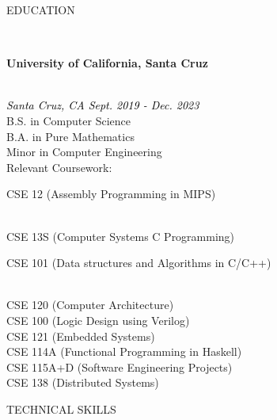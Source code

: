 \documentclass[letterpaper,10pt]{article}
\begin{document}
\begin{multicols*}{2}
  \begin{LARGE} \noindent\faSchool\hspace{5px}EDUCATION \end{LARGE}
  \vspace{.5em} \\
  \begin{large}
    \textbf{University of California, Santa Cruz}
  \end{large} \\
  \textit{\textcolor{black}{Santa Cruz, CA \qquad Sept. 2019 - Dec. 2023}} \\
  B.S. in Computer Science \\ 
  B.A. in Pure Mathematics \\
  Minor in Computer Engineering \\
  Relevant Coursework: \\
  \indent \parbox{.45\textwidth}{CSE 12 (Assembly Programming in MIPS)}\\
  \indent CSE 13S (Computer Systems C Programming)\\
  \indent \parbox{.45\textwidth}{CSE 101 (Data structures and Algorithms in C/C++)}\\
  \indent CSE 120 (Computer Architecture)\\
  \indent CSE 100 (Logic Design using Verilog)\\
  \indent CSE 121 (Embedded Systems)\\
  \indent CSE 114A (Functional Programming in Haskell) \\
  \indent CSE 115A+D (Software Engineering Projects)\\
  \indent CSE 138 (Distributed Systems)
  \vspace{1em} \\
  \begin{LARGE} \faLaptop\hspace{5px}TECHNICAL SKILLS \end{LARGE}

\end{multicols*}
\end{document}
